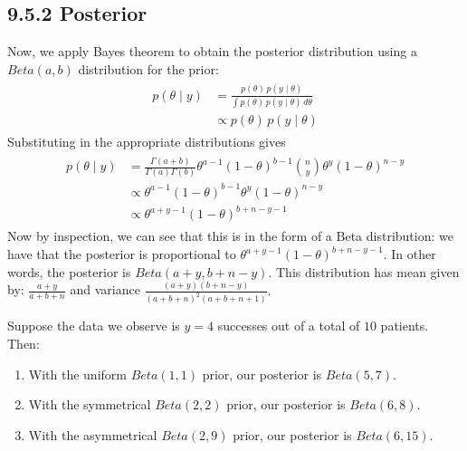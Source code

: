 \documentclass[letterpaper,10pt,english]{jupyterBook}
\begin{document}
\subsection{9.5.2 Posterior}
\label{\detokenize{09.f. Bayesian Statistics I:posterior}}
\sphinxAtStartPar
Now, we apply Bayes theorem to obtain the posterior distribution using a \(Beta(a,b)\) distribution for the prior:
\begin{equation*}
\begin{split}
\begin{align}
p(\theta \mid y) &= \frac{ p(\theta)\, p(y \mid \theta)} {\int  p(\theta)\,p(y \mid \theta)\,d\theta}\\
         &\propto  p(\theta)\, p(y \mid \theta)
         \end{align}
\end{split}
\end{equation*}
\sphinxAtStartPar
Substituting in the appropriate distributions gives
\begin{equation*}
\begin{split}
\begin{align} 
p(\theta \mid y) &= \frac{\Gamma(a+ b)}{ \Gamma(a)\Gamma(b) } \theta^{a-1} (1-\theta)^{b-1}  {n \choose y} \theta^y (1-\theta)^{n-y} \\
         &\propto \theta^{a-1} (1-\theta)^{b-1} \theta^y (1-\theta)^{n-y} \\
         &\propto \theta^{a+y-1} (1-\theta)^{b+n-y-1} 
         \end{align}
\end{split}
\end{equation*}
\sphinxAtStartPar
Now by inspection, we can see that this is in the form of a Beta distribution: we have that the posterior is proportional to \(\theta^{a+y-1} (1-\theta)^{b+n-y-1}\). In other words, the posterior is \(Beta(a+y, b+n-y).\) This distribution has mean given by: \(\frac{a+y}{a+b+n}\) and variance \(\frac{(a+y)(b+n-y)}{(a+b+n)^2(a+b+n+1)}.\)

\sphinxAtStartPar
Suppose the data we observe is \(y=4\) successes out of a total of \(10\) patients. Then:
\begin{enumerate}
%
\item {} 
\sphinxAtStartPar
With the uniform \(Beta(1,1)\) prior, our posterior is \(Beta(5, 7)\).

\item {} 
\sphinxAtStartPar
With the symmetrical \(Beta(2, 2)\) prior, our posterior is \(Beta(6, 8)\).

\item {} 
\sphinxAtStartPar
With the asymmetrical \(Beta(2, 9)\) prior, our posterior is \(Beta(6, 15)\).

\end{enumerate}
\end{document}
